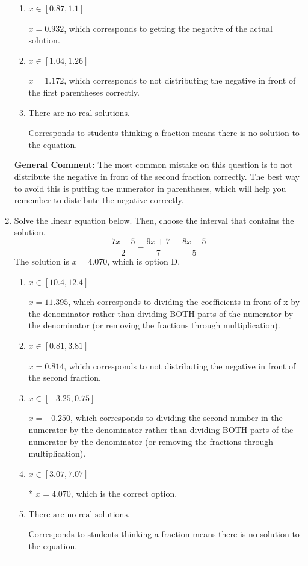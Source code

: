 \documentclass{extbook}[14pt]
\newcommand{\litem}[1]{\item #1

\rule{\textwidth}{0.4pt}}
\begin{document}
\begin{enumerate}
{\begin{enumerate}[label=\Alph*.]
* $x = 0.441$, which is the correct option.
\item \( x \in [0.87, 1.1] \)

$x = 0.932$, which corresponds to getting the negative of the actual solution.
\item \( x \in [1.04, 1.26] \)

$x = 1.172$, which corresponds to not distributing the negative in front of the first parentheses correctly.
\item \( \text{There are no real solutions.} \)

Corresponds to students thinking a fraction means there is no solution to the equation.
\end{enumerate}

\textbf{General Comment:} The most common mistake on this question is to not distribute the negative in front of the second fraction correctly. The best way to avoid this is putting the numerator in parentheses, which will help you remember to distribute the negative correctly.
}
\litem{
Solve the linear equation below. Then, choose the interval that contains the solution.
\[ \frac{7x -5}{2} - \frac{9x + 7}{7} = \frac{8x -5}{5} \]The solution is \( x = 4.070 \), which is option D.\begin{enumerate}[label=\Alph*.]
\item \( x \in [10.4, 12.4] \)

 $x = 11.395$, which corresponds to dividing the coefficients in front of x by the denominator rather than dividing BOTH parts of the numerator by the denominator (or removing the fractions through multiplication).
\item \( x \in [0.81, 3.81] \)

 $x = 0.814$, which corresponds to not distributing the negative in front of the second fraction.
\item \( x \in [-3.25, 0.75] \)

 $x = -0.250$, which corresponds to dividing the second number in the numerator by the denominator rather than dividing BOTH parts of the numerator by the denominator (or removing the fractions through multiplication).
\item \( x \in [3.07, 7.07] \)

* $x = 4.070$, which is the correct option.
\item \( \text{There are no real solutions.} \)

Corresponds to students thinking a fraction means there is no solution to the equation.
\end{enumerate}

}
\end{enumerate}
\end{document}
